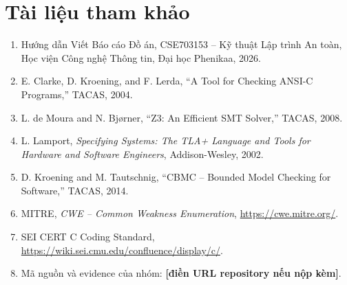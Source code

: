 \documentclass[12pt,a4paper]{article}
\newcommand{\mustfill}[1]{\textcolor{secondary}{\textbf{[#1]}}}
\begin{document}
\clearpage
\section*{Tài liệu tham khảo}
\begin{enumerate}[leftmargin=1.6em]
\item Hướng dẫn Viết Báo cáo Đồ án, CSE703153 -- Kỹ thuật Lập trình An toàn,
Học viện Công nghệ Thông tin, Đại học Phenikaa, 2026.
\item E. Clarke, D. Kroening, and F. Lerda, ``A Tool for Checking ANSI-C
Programs,'' TACAS, 2004.
\item L. de Moura and N. Bjørner, ``Z3: An Efficient SMT Solver,'' TACAS, 2008.
\item L. Lamport, \textit{Specifying Systems: The TLA+ Language and Tools for
Hardware and Software Engineers}, Addison-Wesley, 2002.
\item D. Kroening and M. Tautschnig, ``CBMC -- Bounded Model Checking for
Software,'' TACAS, 2014.
\item MITRE, \textit{CWE -- Common Weakness Enumeration}, \url{https://cwe.mitre.org/}.
\item SEI CERT C Coding Standard, \url{https://wiki.sei.cmu.edu/confluence/display/c/}.
\item Mã nguồn và evidence của nhóm:
\mustfill{điền URL repository nếu nộp kèm}.
\end{enumerate}
\end{document}
